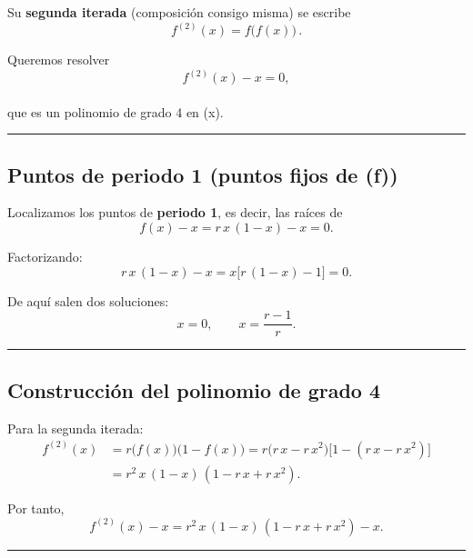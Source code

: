 \documentclass[
  10pt,
  a4paper,
  DIV=11,
  numbers=noendperiod,
  open=any]{scrreprt}
\numberwithin{equation}{chapter}
\numberwithin{equation}{chapter}
\renewcommand{\[}{\begin{equation}}
\renewcommand{\]}{\end{equation}}
\begin{document}
Su \textbf{segunda iterada} (composición consigo misma) se escribe\\
\[
f^{(2)}(x) = f\bigl(f(x)\bigr)\,.
\]

Queremos resolver\\
\[
f^{(2)}(x) - x = 0,
\]\\
que es un polinomio de grado 4 en (x).

\begin{center}\rule{0.5\linewidth}{0.5pt}\end{center}

\subsection{Puntos de periodo 1 (puntos fijos de
(f))}\label{puntos-de-periodo-1-puntos-fijos-de-f}

Localizamos los puntos de \textbf{periodo 1}, es decir, las raíces de\\
\[
f(x) - x = r\,x\,(1 - x) - x = 0.
\]

Factorizando:\\
\[
r\,x\,(1 - x) - x
= x\bigl[r\,(1 - x) - 1\bigr]
= 0.
\]

De aquí salen dos soluciones:\\
\[
x = 0,
\qquad
x = \frac{r-1}{r}.
\]

\begin{center}\rule{0.5\linewidth}{0.5pt}\end{center}

\subsection{Construcción del polinomio de grado
4}\label{construcciuxf3n-del-polinomio-de-grado-4}

Para la segunda iterada:\\
\[
\begin{align*}
f^{(2)}(x)
&= r\bigl(f(x)\bigr)\bigl(1 - f(x)\bigr)
= r\bigl(r\,x - r\,x^2\bigr)\bigl[1 - (r\,x - r\,x^2)\bigr]\\[6pt]
&= r^2\,x\,(1 - x)\,(1 - r\,x + r\,x^2).
\end{align*}
\]

Por tanto,\\
\[
f^{(2)}(x) - x
= r^2\,x\,(1 - x)\,(1 - r\,x + r\,x^2) - x.
\]

\begin{center}\rule{0.5\linewidth}{0.5pt}\end{center}
\end{document}
